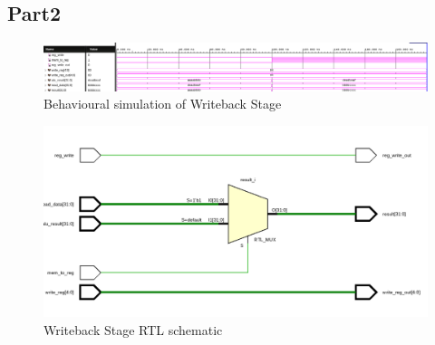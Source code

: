 \documentclass[CMPE]{../KGCOEReport}
\begin{document}
    \subsection*{Part2}
    \begin{figure}[h!]
        \centering
        \includegraphics[width=\textwidth]{img/writeback_stage_behav}
        \caption{Behavioural simulation of Writeback Stage}
        \label{fig:demo1}
	\end{figure}
    \begin{figure}[h!]
        \centering
        \includegraphics[width=\textwidth]{img/writeback_stage_schem}
        \caption{Writeback Stage RTL schematic}
        \label{fig:demo1}
	\end{figure}
    
\end{document}
